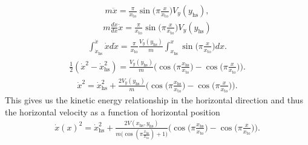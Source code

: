 \documentclass[journal,12pt,onecolumn]{IEEEtran}
\begin{document}
\begin{align}
	m\ddot{x} = \frac{\pi}{x_{\text{to}}} \sin\Big(\pi\frac{x}{x_\text{to}}\Big)  V_y(y_{\text{hs}}),
\end{align}
\begin{align}
	m\frac{d\dot{x}}{dx} \dot{x} =  \frac{\pi}{x_{\text{to}}} \sin\Big(\pi\frac{x}{x_\text{to}}\Big) V_y(y_{\text{hs}})
\end{align}	
\begin{align}
	\int_{\dot{x}_{\text{hs}}}^{\dot{x}}\dot{x}d\dot{x} = \frac{\pi}{x_{\text{to}}} \frac{V_y(y_{\text{hs}})}{m}\int_{x_{\text{hs}}}^{x}\sin\Big(\pi\frac{x}{x_\text{to}}\Big)dx.
\end{align}
\begin{align}
	\frac{1}{2}(\dot{x}^2 - \dot{x}_{\text{hs}}^2) = \frac{V_y(y_{\text{hs}})}{m} \Big(\cos\big(\pi \frac{x_{\text{hs}}}{x_{\text{to}}} \big) -\cos\big(\pi \frac{x}{x_{\text{to}}} \big) \Big).
\end{align}
\begin{align}
	\dot{x}^2 = \dot{x}_{\text{hs}}^2 +\frac{2V_y(y_{\text{hs}})}{m} \Big(\cos\big(\pi \frac{x_{\text{hs}}}{x_{\text{to}}} \big) -\cos\big(\pi \frac{x}{x_{\text{to}}} \big) \Big).
\end{align}
This gives us the kinetic energy relationship in the horizontal direction and thus the horizontal velocity as a function of horizontal position
\begin{align}
	\dot{x}(x)^2 = \dot{x}_{\text{hs}}^2 + \frac{2V(x_\text{hs},y_\text{hs})}{m\Big(\cos(\pi \frac{x_{\text{hs}}}{x_{\text{to}}})+1 \Big)}\Big(\cos\big(\pi \frac{x_{\text{hs}}}{x_{\text{to}}} \big) -\cos\big(\pi \frac{x}{x_{\text{to}}} \big) \Big).
\end{align}
\end{document}
